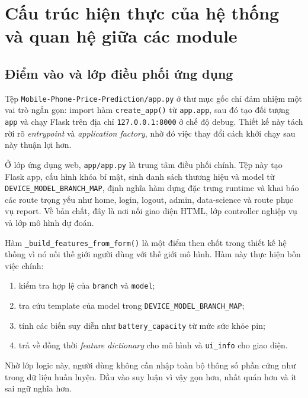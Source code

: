 \section{Cấu trúc hiện thực của hệ thống và quan hệ giữa các module}

\subsection{Điểm vào và lớp điều phối ứng dụng}


Tệp \texttt{Mobile-Phone-Price-Prediction/app.py} ở thư mục gốc chỉ đảm nhiệm một vai trò ngắn gọn: import hàm \texttt{create\_app()} từ \texttt{app.app}, sau đó tạo đối tượng \texttt{app} và chạy Flask trên địa chỉ \texttt{127.0.0.1:8000} ở chế độ debug. Thiết kế này tách rời rõ \textit{entrypoint} và \textit{application factory}, nhờ đó việc thay đổi cách khởi chạy sau này thuận lợi hơn.


Ở lớp ứng dụng web, \texttt{app/app.py} là trung tâm điều phối chính. Tệp này tạo Flask app, cấu hình khóa bí mật, sinh danh sách thương hiệu và model từ \texttt{DEVICE\_MODEL\_BRANCH\_MAP}, định nghĩa hàm dựng đặc trưng runtime và khai báo các route trọng yếu như home, login, logout, admin, data-science và route phục vụ report. Về bản chất, đây là nơi nối giao diện HTML, lớp controller nghiệp vụ và lớp mô hình dự đoán.


Hàm \texttt{\_build\_features\_from\_form()} là một điểm then chốt trong thiết kế hệ thống vì nó nối thế giới người dùng với thế giới mô hình. Hàm này thực hiện bốn việc chính:
\begin{enumerate}[label=\arabic*.]
    \item kiểm tra hợp lệ của \texttt{branch} và \texttt{model};
    \item tra cứu template của model trong \texttt{DEVICE\_MODEL\_BRANCH\_MAP};
    \item tính các biến suy diễn như \texttt{battery\_capacity} từ mức sức khỏe pin;
    \item trả về đồng thời \textit{feature dictionary} cho mô hình và \texttt{ui\_info} cho giao diện.
\end{enumerate}

Nhờ lớp logic này, người dùng không cần nhập toàn bộ thông số phần cứng như trong dữ liệu huấn luyện. Đầu vào suy luận vì vậy gọn hơn, nhất quán hơn và ít sai ngữ nghĩa hơn.

